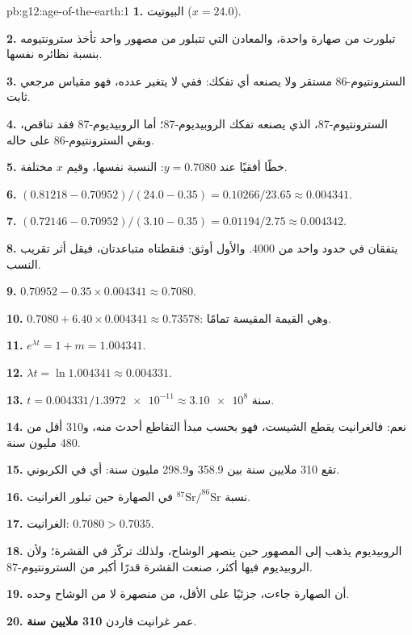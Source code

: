 \begin{solution}{pb:g12:age-of-the-earth:1}
\textbf{1.} البيوتيت ($x = 24.0$).

\textbf{2.} تبلورت من صهارة واحدة، والمعادن التي تتبلور
من مصهور واحد تأخذ سترونتيومه بنسبة نظائره نفسها.

\textbf{3.} السترونتيوم-86 مستقر ولا يصنعه أي تفكك: ففي 
لا يتغير عدده، فهو مقياس مرجعي ثابت.

\textbf{4.} السترونتيوم-87، الذي يصنعه تفكك الروبيديوم-87؛ أما الروبيديوم-87 فقد
تناقص، وبقي السترونتيوم-86 على حاله.

\textbf{5.} خطًا أفقيًا عند $y = 0.7080$: النسبة نفسها، وقيم $x$ مختلفة.

\textbf{6.} $(0.81218 - 0.70952)/(24.0 - 0.35) = 0.10266/23.65 \approx
0.004341$.

\textbf{7.} $(0.72146 - 0.70952)/(3.10 - 0.35) = 0.01194/2.75 \approx
0.004342$.

\textbf{8.} يتفقان في حدود واحد من 4000. والأول أوثق:
فنقطتاه متباعدتان، فيقل أثر تقريب النسب.

\textbf{9.} $0.70952 - 0.35 \times 0.004341 \approx 0.7080$.

\textbf{10.} $0.7080 + 6.40 \times 0.004341 \approx 0.73578$: وهي
القيمة المقيسة تمامًا.

\textbf{11.} $e^{\lambda t} = 1 + m = 1.004341$.

\textbf{12.} $\lambda t = \ln 1.004341 \approx 0.004331$.

\textbf{13.} $t = 0.004331/\num{1.3972e-11} \approx \num{3.10e8}$ سنة.

\textbf{14.} نعم: فالغرانيت يقطع الشيست، فهو بحسب مبدأ
التقاطع أحدث منه، و310 أقل من 480 مليون
سنة.

\textbf{15.} تقع 310 ملايين سنة بين 358.9 و298.9 مليون سنة:
أي في الكربوني.

\textbf{16.} نسبة $^{87}\mathrm{Sr}/^{86}\mathrm{Sr}$ في الصهارة حين
تبلور الغرانيت.

\textbf{17.} الغرانيت: $0.7080 > 0.7035$.

\textbf{18.} الروبيديوم يذهب إلى المصهور حين ينصهر الوشاح، ولذلك
تركّز في القشرة؛ ولأن الروبيديوم فيها أكثر، صنعت القشرة قدرًا أكبر من
السترونتيوم-87.

\textbf{19.} أن الصهارة جاءت، جزئيًا على الأقل، من  منصهرة
لا من الوشاح وحده.

\textbf{20.} عمر غرانيت فاردن \textbf{310 ملايين سنة}.
\end{solution}
